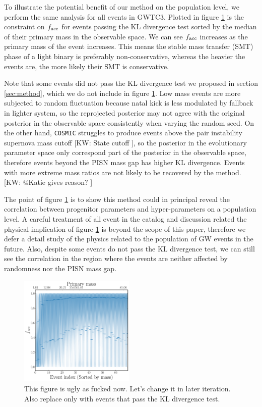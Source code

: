 \documentclass[twocolumn]{aastex631}
\newcommand{\kw}[1]{{\color{rb4}[KW: #1 ]}}
\begin{document}
To illustrate the potential benefit of our method on the population level, we perform the same analysis for all events in GWTC3.
Plotted in figure \ref{fig:GWTC3_alpha_mass} is the constraint on $f_{\rm acc}$ for events passing the KL divergence test sorted by the median of their primary mass in the observable space.
We can see $f_{\rm acc}$ increases as the primary mass of the event increases.
This means the stable mass transfer (SMT) phase of a light binary is preferably non-conservative, whereas the heavier the events are, the more likely their SMT is conservative.

Note that some events did not pass the KL divergence test we proposed in section \ref{sec:method}, which we do not include in figure \ref{fig:GWTC3_alpha_mass}.
Low mass events are more subjected to random fluctuation because natal kick is less modulated by fallback in lighter system,
so the reprojected posterior may not agree with the original posterior in the observable space consistently when varying the random seed.
On the other hand, \texttt{COSMIC} struggles to produce events above the pair instability supernova mass cutoff \kw{State cutoff},
so the posterior in the evolutionary parameter space only correspond part of the posterior in the observable space, therefore events beyond the PISN mass gap has higher KL divergence.
Events with more extreme mass ratios are not likely to be recovered by the method. \kw{@Katie gives reason?}

The point of figure \ref{fig:GWTC3_alpha_mass} is to show this method could in principal reveal the correlation between progenitor parameters and hyper-parameters on a population level.
A careful treatment of all event in the catalog and discussion related the physical implication of figure \ref{fig:GWTC3_alpha_mass} is beyond the scope of this paper,
therefore we defer a detail study of the physics related to the population of GW events in the future.
Also, despite some events do not pass the KL divergence test, we can still see the correlation in the region where the events are neither affected by randomness nor the PISN mass gap.


\begin{figure}
\includegraphics[width=0.49\textwidth]{static/GWTC3_alpha_mass.pdf}
\caption{This figure is ugly as fucked now. Let's change it in later iteration.
Also replace only with events that pass the KL divergence test.}
\label{fig:GWTC3_alpha_mass}
\end{figure}
\end{document}
